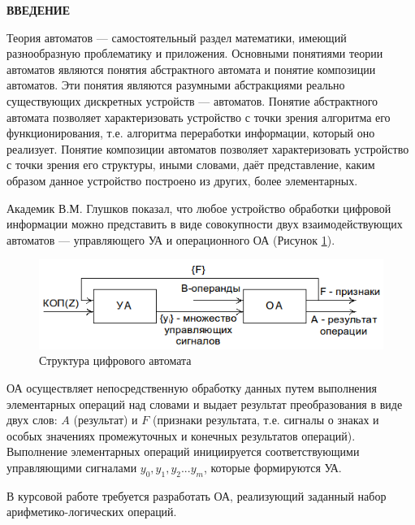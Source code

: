 
\begin{center}
\textbf{ВВЕДЕНИЕ}
\end{center}

Теория автоматов --- самостоятельный раздел математики, имеющий разнообразную проблематику и приложения.  Основными понятиями теории автоматов являются понятия абстрактного автомата и понятие композиции автоматов. Эти понятия являются разумными абстракциями реально существующих дискретных устройств --- автоматов. Понятие абстрактного автомата позволяет характеризовать устройство с точки зрения алгоритма его функционирования, т.е. алгоритма переработки информации, который оно реализует. Понятие композиции автоматов позволяет характеризовать устройство с точки зрения его структуры, иными словами, даёт представление, каким образом данное устройство построено из других, более элементарных.

Академик В.М. Глушков показал, что любое устройство обработки цифровой информации можно представить в виде совокупности двух взаимодействующих автоматов --- управляющего УА и операционного ОА (Рисунок \ref{figure:intro_pic}).

\begin{figure}[H]
	\includegraphics[scale=0.6]{images/intro.png}
	\caption{Структура цифрового автомата}
	\label{figure:intro_pic}
\end{figure}

ОА осуществляет непосредственную обработку данных путем выполнения элементарных операций над словами и выдает результат преобразования в виде двух слов: $A$ (результат) и $F$ (признаки результата, т.е. сигналы о знаках и особых значениях промежуточных и конечных результатов операций). Выполнение элементарных операций инициируется соответствующими управляющими сигналами {$y_0, y_1, y_2 ... y_m$}, которые формируются УА. 

В курсовой работе требуется разработать ОА, реализующий заданный набор арифметико-логических операций.
